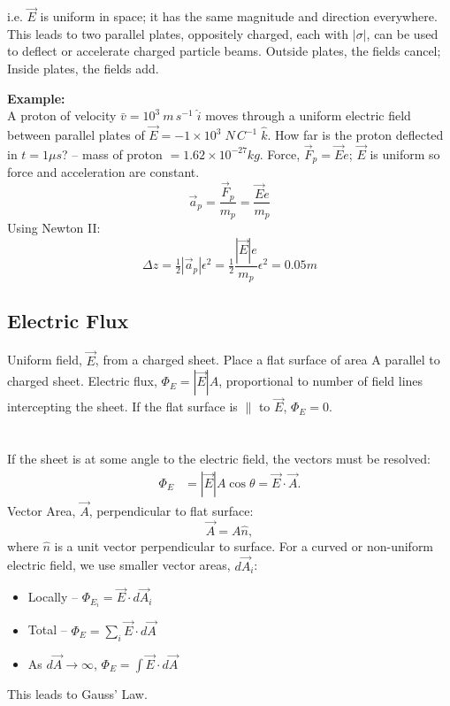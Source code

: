 \documentclass[a4paper, 11pt, normalem]{report}
\begin{document}
i.e. $\vec{E}$ is uniform in space; it has the same magnitude and direction everywhere.
This leads to two parallel plates, oppositely charged, each with $|\sigma|$, can be used to deflect or accelerate charged particle beams.
Outside plates, the fields cancel; Inside plates, the fields add.

\textbf{Example:}\\
A proton of velocity $\bar{v} = 10^{3} \: m \, s^{-1} \; \hat{i}$ moves through a uniform electric field between parallel plates of $\vec{E} = -1 \times 10^{3} \; N \, C^{-1} \; \hat{k}$.
How far is the proton deflected in $t = 1 \mu s$? -- mass of proton $= 1.62 \times 10^{-27} kg$.
Force, $\vec{F}_{p} = \vec{E}e$; $\vec{E}$ is uniform so force and acceleration are constant.
\begin{equation}
    \vec{a}_{p} = \frac{\vec{F}_{p}}{m_{p}} = \frac{\vec{E}e}{m_{p}}
\end{equation}
Using Newton \RN{2}:
\begin{equation}
    \Delta z = \tfrac{1}{2}|\vec{a}_{p}|\epsilon^{2} = \tfrac{1}{2} \frac{|\vec{E}|e}{m_{p}}\epsilon^{2} = 0.05m
\end{equation}

\section{Electric Flux}
Uniform field, $\vec{E}$, from a charged sheet.
Place a flat surface of area A parallel to charged sheet.
Electric flux, $\Phi_{E} = |\vec{E}|A$, proportional to number of field lines intercepting the sheet.
If the flat surface is $\parallel$ to $\vec{E}$, $\Phi_{E} = 0$.

\chapter{}
If the sheet is at some angle to the electric field, the vectors must be resolved:
\begin{align}
    \Phi_{E} &= |\vec{E}|A\cos\theta = \vec{E} \cdot \vec{A}.
\end{align}
Vector Area, $\vec{A}$, perpendicular to flat surface:
\begin{equation}
    \vec{A} = A\hat{n},
\end{equation}
where $\hat{n}$ is a unit vector perpendicular to surface.
For a curved or non-uniform electric field, we use smaller vector areas, $d\vec{A}_{i}$:
\begin{itemize}
    \item Locally -- $\Phi_{E_{i}} = \vec{E} \cdot d\vec{A}_{i}$
    \item Total -- $\Phi_{E} = \sum_{i} \vec{E} \cdot d\vec{A}$
    \item As $d\vec{A} \to \infty$, $\Phi_{E} = \int \vec{E} \cdot d\vec{A}$
\end{itemize}
This leads to Gauss' Law.
\end{document}
